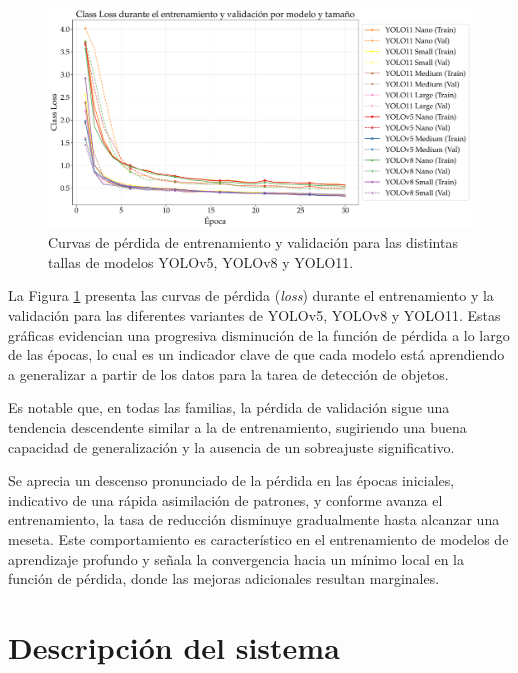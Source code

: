 \documentclass[11pt,spanish,listoffigures,listoftables]{tfgetsinf}
\begin{document}
\begin{figure}[H]
   \centering
   \includegraphics[width=\linewidth]{excels/entrenamiento/loss_plot.pdf}
   \caption[Curvas de pérdida de entrenamiento y validación para las distintas tallas de modelos YOLOv5, YOLOv8 y YOLO11]{Curvas de pérdida de entrenamiento y validación para las distintas tallas de modelos YOLOv5, YOLOv8 y YOLO11.}
   \label{fig:loss_curves}
\end{figure}

La Figura \ref{fig:loss_curves} presenta las curvas de pérdida (\textit{loss}) durante el entrenamiento y la validación para las diferentes variantes de YOLOv5, YOLOv8 y YOLO11. Estas gráficas evidencian una progresiva disminución de la función de pérdida a lo largo de las épocas, lo cual es un indicador clave de que cada modelo está aprendiendo a generalizar a partir de los datos para la tarea de detección de objetos. 

Es notable que, en todas las familias, la pérdida de validación sigue una tendencia descendente similar a la de entrenamiento, sugiriendo una buena capacidad de generalización y la ausencia de un sobreajuste significativo. 

Se aprecia un descenso pronunciado de la pérdida en las épocas iniciales, indicativo de una rápida asimilación de patrones, y conforme avanza el entrenamiento, la tasa de reducción disminuye gradualmente hasta alcanzar una meseta. Este comportamiento es característico en el entrenamiento de modelos de aprendizaje profundo y señala la convergencia hacia un mínimo local en la función de pérdida, donde las mejoras adicionales resultan marginales.


\section{Descripción del sistema} \label{sec:descripcion_sistema}
\end{document}
